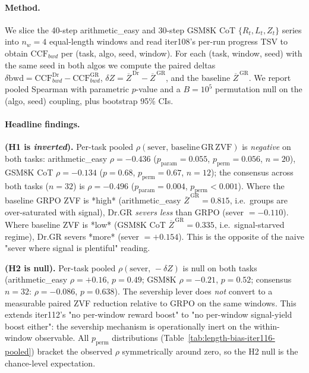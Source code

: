 \paragraph{Method.}
We slice the 40-step arithmetic\_easy and 30-step GSM8K CoT
$\{R_t,L_t,Z_t\}$ series into $n_w=4$ equal-length windows and read
iter108's per-run progress TSV to obtain $\mathrm{CCF}_{bwd}$ per
(task, algo, seed, window).  For each (task, window, seed) with the
same seed in both algos we compute the paired deltas
$\delta\mathrm{bwd}=\mathrm{CCF}^{\mathrm{Dr}}_{bwd}-\mathrm{CCF}^{\mathrm{GR}}_{bwd}$,
$\delta Z=\overline{Z}^{\,\mathrm{Dr}}-\overline{Z}^{\,\mathrm{GR}}$,
and the baseline $\overline{Z}^{\,\mathrm{GR}}$.  We report pooled
Spearman with parametric $p$-value and a $B=10^{5}$ permutation
null on the (algo, seed) coupling, plus bootstrap 95\% CIs.

\paragraph{Headline findings.}
\textbf{(H1 is \emph{inverted}).}  Per-task pooled
$\rho(\mathrm{sever},\,\mathrm{baseline\,GR\,ZVF})$ is
\emph{negative} on both tasks: arithmetic\_easy
$\rho=-0.436$ ($p_{\mathrm{param}}{=}0.055$, $p_{\mathrm{perm}}{=}0.056$,
$n{=}20$), GSM8K CoT $\rho=-0.134$ ($p{=}0.68$, $p_{\mathrm{perm}}{=}0.67$,
$n{=}12$); the consensus across both tasks ($n{=}32$) is
$\rho=-0.496$ ($p_{\mathrm{param}}{=}0.004$, $p_{\mathrm{perm}}{<}0.001$).
Where the baseline GRPO ZVF is *high* (arithmetic\_easy
$\overline{Z}^{\,\mathrm{GR}}{=}0.815$, i.e.\ groups are
over-saturated with signal), Dr.GR \emph{severs less} than GRPO
(sever $=-0.110$).  Where baseline ZVF is *low* (GSM8K CoT
$\overline{Z}^{\,\mathrm{GR}}{=}0.335$, i.e.\ signal-starved
regime), Dr.GR severs *more* (sever $=+0.154$).  This is the
opposite of the naive "sever where signal is plentiful" reading.

\textbf{(H2 is null).}  Per-task pooled
$\rho(\mathrm{sever},\,-\delta Z)$ is null on both tasks
(arithmetic\_easy $\rho=+0.16$, $p{=}0.49$; GSM8K $\rho=-0.21$,
$p{=}0.52$; consensus $n{=}32$: $\rho=-0.086$, $p{=}0.638$).
The severship lever does \emph{not} convert to a measurable
paired ZVF reduction relative to GRPO on the same windows.  This
extends iter112's "no per-window reward boost" to "no per-window
signal-yield boost either": the severship mechanism is operationally
inert on the within-window observable.  All $p_{\mathrm{perm}}$
distributions (Table~\ref{tab:length-bias-iter116-pooled}) bracket
the observed $\rho$ symmetrically around zero, so the H2 null is
the chance-level expectation.

